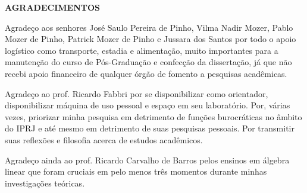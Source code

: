 \pagestyle{empty}

\begin{center}
{\bf AGRADECIMENTOS}
\end{center}

\vspace{1 cm}

Agradeço aos senhores José Saulo Pereira de Pinho, Vilma Nadir Mozer, Pablo Mozer de Pinho, Patrick Mozer de Pinho e Jussara dos Santos por todo o apoio logístico como transporte, estadia e alimentação, muito importantes para a manutenção do curso de Pós-Graduação e confecção da dissertação, já que não recebi apoio financeiro de qualquer órgão de fomento a pesquisas acadêmicas.

Agradeço ao prof. Ricardo Fabbri por se disponibilizar como orientador, disponibilizar máquina de uso pessoal e espaço em seu laboratório. Por, várias vezes, priorizar minha pesquisa em detrimento de funções burocráticas no âmbito do IPRJ e até mesmo em detrimento de suas pesquisas pessoais. Por transmitir suas reflexões e filosofia acerca de estudos acadêmicos. 

Agradeço ainda ao prof. Ricardo Carvalho de Barros pelos ensinos em álgebra linear que foram cruciais em pelo menos três momentos durante minhas investigações teóricas.
\newpage